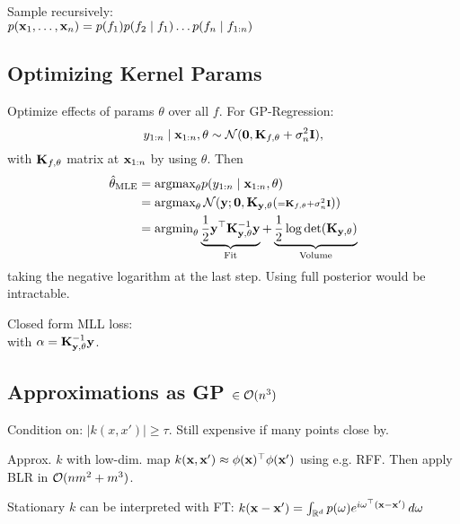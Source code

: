 \begin{definition}
    Sample recursively: \\
    \(p(\vb{x}_1, \ldots, \vb{x}_n) = p(f_1)p(f_2 \mid f_1)\ldots p(f_n \mid f_{1:n})\)
\end{definition}

\subsection{Optimizing Kernel Params}

\begin{definition}
    Optimize effects of params \(\theta\) over all \(f\). For GP-Regression:
    \[y_{1:n} \mid \vb{x}_{1:n}, \theta \sim \operatorname{\mathcal{N}}(\vb{0}, \vb{K}_{f, \theta} + \sigma_n^2\vb{I}),\]
    with \(\vb{K}_{f, \theta}\) matrix at \(\vb{x}_{1:n}\) by using \(\theta\). Then
    \begin{align*}
        \hat\theta_{\text{MLE}} &= \text{argmax}_{\theta} p(y_{1:n} \mid \vb{x}_{1:n}, \theta) \\
        &=\text{argmax}_{\theta} \operatorname{\mathcal{N}}(\vb{y}; \vb{0}, \vb{K}_{\vb{y}, \theta} ({\scriptstyle = \vb{K}_{f, \theta} + \sigma_n^2\vb{I}})) \\
        &= \text{argmin}_{\theta} \underbrace{\frac{1}{2}\vb{y}^\top \vb{K}_{\vb{y}, \theta}^{-1} \vb{y}}_{\text{Fit}} + \underbrace{\frac{1}{2} \log\det(\vb{K}_{\vb{y}, \theta})}_{\text{Volume}}
    \end{align*}
    taking the negative logarithm at the last step.
    Using full posterior would be intractable.
\end{definition}

\begin{definition}
    Closed form MLL loss: \\
    with \(\vb{\alpha} = \vb{K}_{\vb{y}, \theta}^{-1}\vb{y}\).
\end{definition}

\subsection{Approximations as GP \(\in \mathcal{O}(n^3)\)}

\begin{definition}
    Condition on: \(|k(x, x')| \geq \tau\). Still expensive if many points close by.
\end{definition}

\begin{definition}
    Approx. \(k\) with low-dim. map  \(k(\vb{x},\vb{x}') \approx \phi(\vb{x})^\top\phi(\vb{x}')\) using e.g. RFF.
    Then apply BLR in \(\mathcal{O}(nm^2 + m^3)\).
\end{definition}

\begin{definition}[RFF]
    Stationary \(k\) can be interpreted with FT: \(k(\vb{x}-\vb{x}') = \int_{\mathbb{R}^d} p(\omega) e^{i \omega^\top(\vb{x} - \vb{x}')} \, d\omega\) 
\end{definition}
